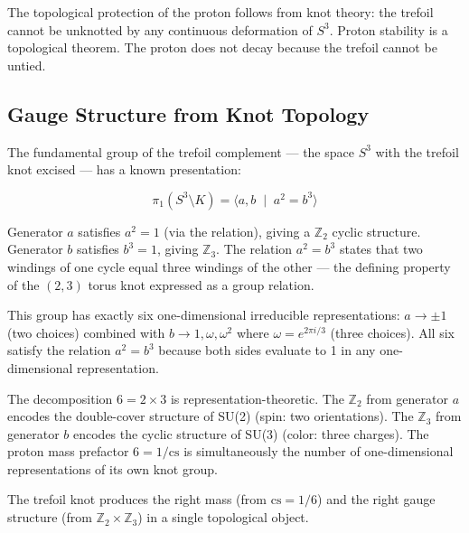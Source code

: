 The topological protection of the proton follows from knot theory: the trefoil cannot be unknotted by any continuous deformation of $S^3$. Proton stability is a topological theorem. The proton does not decay because the trefoil cannot be untied.



\subsection{Gauge Structure from Knot Topology}

The fundamental group of the trefoil complement --- the space $S^3$ with the trefoil knot excised --- has a known presentation:

$$\pi_1(S^3 \setminus K) = \langle a, b \;\mid\; a^2 = b^3 \rangle$$

Generator $a$ satisfies $a^2 = 1$ (via the relation), giving a $\mathbb{Z}_2$ cyclic structure. Generator $b$ satisfies $b^3 = 1$, giving $\mathbb{Z}_3$. The relation $a^2 = b^3$ states that two windings of one cycle equal three windings of the other --- the defining property of the $(2,3)$ torus knot expressed as a group relation.

This group has exactly six one-dimensional irreducible representations: $a \to \pm 1$ (two choices) combined with $b \to 1, \omega, \omega^2$ where $\omega = e^{2\pi i/3}$ (three choices). All six satisfy the relation $a^2 = b^3$ because both sides evaluate to 1 in any one-dimensional representation.

The decomposition $6 = 2 \times 3$ is representation-theoretic. The $\mathbb{Z}_2$ from generator $a$ encodes the double-cover structure of SU(2) (spin: two orientations). The $\mathbb{Z}_3$ from generator $b$ encodes the cyclic structure of SU(3) (color: three charges). The proton mass prefactor $6 = 1/\mathrm{cs}$ is simultaneously the number of one-dimensional representations of its own knot group.

The trefoil knot produces the right mass (from $\mathrm{cs} = 1/6$) and the right gauge structure (from $\mathbb{Z}_2 \times \mathbb{Z}_3$) in a single topological object.



